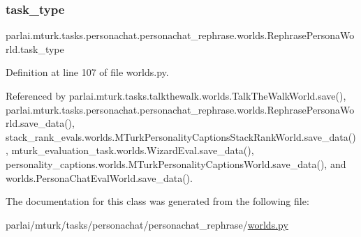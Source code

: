 \subsubsection{\texorpdfstring{task\+\_\+type}{task\_type}}
{\footnotesize\ttfamily parlai.\+mturk.\+tasks.\+personachat.\+personachat\+\_\+rephrase.\+worlds.\+Rephrase\+Persona\+World.\+task\+\_\+type}



Definition at line 107 of file worlds.\+py.



Referenced by parlai.\+mturk.\+tasks.\+talkthewalk.\+worlds.\+Talk\+The\+Walk\+World.\+save(), parlai.\+mturk.\+tasks.\+personachat.\+personachat\+\_\+rephrase.\+worlds.\+Rephrase\+Persona\+World.\+save\+\_\+data(), stack\+\_\+rank\+\_\+evals.\+worlds.\+M\+Turk\+Personality\+Captions\+Stack\+Rank\+World.\+save\+\_\+data(), mturk\+\_\+evaluation\+\_\+task.\+worlds.\+Wizard\+Eval.\+save\+\_\+data(), personality\+\_\+captions.\+worlds.\+M\+Turk\+Personality\+Captions\+World.\+save\+\_\+data(), and worlds.\+Persona\+Chat\+Eval\+World.\+save\+\_\+data().



The documentation for this class was generated from the following file\+:\begin{DoxyCompactItemize}
\item 
parlai/mturk/tasks/personachat/personachat\+\_\+rephrase/\hyperlink{parlai_2mturk_2tasks_2personachat_2personachat__rephrase_2worlds_8py}{worlds.\+py}\end{DoxyCompactItemize}
